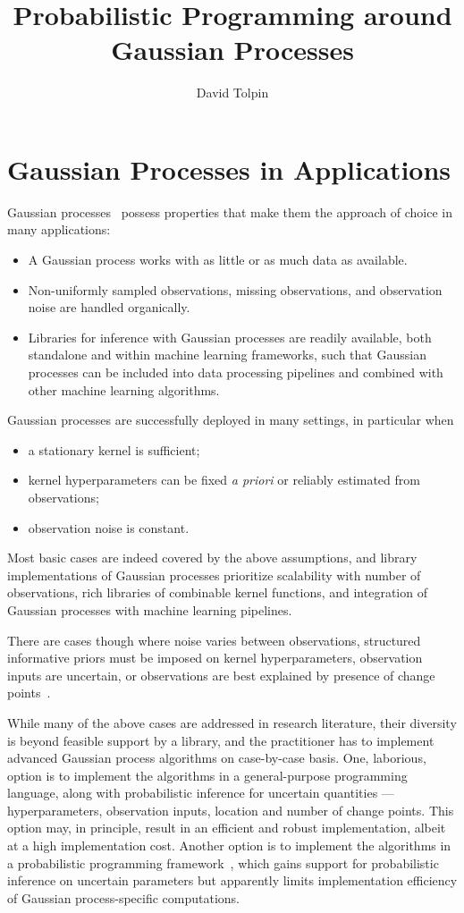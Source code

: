 \documentclass[sigplan,review]{acmart}\settopmatter{printfolios=true,printccs=false,printacmref=false}
\title{Probabilistic Programming around Gaussian Processes}
\author{David Tolpin}
\affiliation{
    \institution{PUB+}
    \country{Israel}
}
\begin{document}
\maketitle

\section{Gaussian Processes in Applications}

Gaussian processes~\cite{} possess properties that make
them the approach of choice in many applications:
\begin{itemize}
    \item A Gaussian process works with as little or as much
    	data as available.
    \item Non-uniformly sampled observations, missing
    	observations, and observation noise are handled
    	organically.
    \item Libraries for inference with Gaussian processes
    	are readily available, both standalone and within
    	machine learning frameworks, such that Gaussian
    	processes can be included into data processing
    	pipelines and combined with other machine learning
    	algorithms.
\end{itemize}

Gaussian processes are successfully deployed in many settings,
in particular when 
\begin{itemize}
    \item a stationary kernel is sufficient;
    \item kernel hyperparameters can be fixed \textit{a priori} or
    	reliably estimated from observations;
    \item observation noise is constant.
\end{itemize}
Most basic cases are indeed covered by the above assumptions,
and library implementations of Gaussian processes prioritize
scalability with number of observations, rich libraries
of combinable kernel functions, and integration of Gaussian
processes with machine learning pipelines.

There are cases though where noise varies between
observations, structured informative priors must be imposed on
kernel hyperparameters, observation inputs are uncertain, or
observations are best explained by presence of change
points~\cite{}.

While many of the above cases are addressed in research
literature, their diversity is beyond feasible support by a
library, and the practitioner has to implement advanced Gaussian
process algorithms on case-by-case basis. One, laborious, option
is to implement the algorithms in a general-purpose programming
language, along with probabilistic inference for uncertain
quantities --- hyperparameters, observation inputs, location and
number of change points.  This option may, in principle, result
in an efficient and robust implementation, albeit at a high
implementation cost. Another option is to implement the
algorithms in a probabilistic programming framework~\cite{},
which gains support for probabilistic inference on uncertain
parameters but apparently limits implementation efficiency of
Gaussian process-specific computations.
\end{document}
